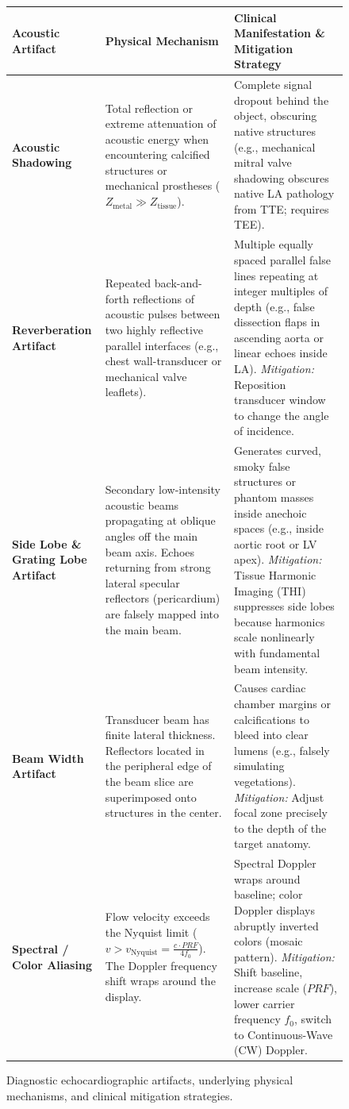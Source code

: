 \documentclass[11pt,a4paper]{article}
\begin{document}
\begin{figure}[htbp]
\centering
\setlength{\tabcolsep}{4pt}
\begin{tabular}{p{3.8cm}p{5.5cm}p{5.5cm}}
\toprule
\textbf{Acoustic Artifact} & \textbf{Physical Mechanism} & \textbf{Clinical Manifestation \& Mitigation Strategy} \\
\midrule
\textbf{Acoustic Shadowing} & Total reflection or extreme attenuation of acoustic energy when encountering calcified structures or mechanical prostheses ($Z_{\text{metal}} \gg Z_{\text{tissue}}$). & Complete signal dropout behind the object, obscuring native structures (e.g., mechanical mitral valve shadowing obscures native LA pathology from TTE; requires TEE). \\
\addlinespace
\textbf{Reverberation Artifact} & Repeated back-and-forth reflections of acoustic pulses between two highly reflective parallel interfaces (e.g., chest wall-transducer or mechanical valve leaflets). & Multiple equally spaced parallel false lines repeating at integer multiples of depth (e.g., false dissection flaps in ascending aorta or linear echoes inside LA). \textit{Mitigation:} Reposition transducer window to change the angle of incidence. \\
\addlinespace
\textbf{Side Lobe \& Grating Lobe Artifact} & Secondary low-intensity acoustic beams propagating at oblique angles off the main beam axis. Echoes returning from strong lateral specular reflectors (pericardium) are falsely mapped into the main beam. & Generates curved, smoky false structures or phantom masses inside anechoic spaces (e.g., inside aortic root or LV apex). \textit{Mitigation:} Tissue Harmonic Imaging (THI) suppresses side lobes because harmonics scale nonlinearly with fundamental beam intensity. \\
\addlinespace
\textbf{Beam Width Artifact} & Transducer beam has finite lateral thickness. Reflectors located in the peripheral edge of the beam slice are superimposed onto structures in the center. & Causes cardiac chamber margins or calcifications to bleed into clear lumens (e.g., falsely simulating vegetations). \textit{Mitigation:} Adjust focal zone precisely to the depth of the target anatomy. \\
\addlinespace
\textbf{Spectral / Color Aliasing} & Flow velocity exceeds the Nyquist limit ($v > v_{\text{Nyquist}} = \frac{c \cdot PRF}{4 f_0}$). The Doppler frequency shift wraps around the display. & Spectral Doppler wraps around baseline; color Doppler displays abruptly inverted colors (mosaic pattern). \textit{Mitigation:} Shift baseline, increase scale ($PRF$), lower carrier frequency $f_0$, switch to Continuous-Wave (CW) Doppler. \\
\bottomrule
\end{tabular}
\caption{Diagnostic echocardiographic artifacts, underlying physical mechanisms, and clinical mitigation strategies.}
\label{tab:artifacts}
\end{figure}
\end{document}
